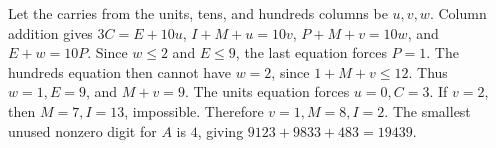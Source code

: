 Let the carries from the units, tens, and hundreds columns be $u,v,w$. Column addition gives $3C=E+10u$, $I+M+u=10v$, $P+M+v=10w$, and $E+w=10P$. Since $w\le2$ and $E\le9$, the last equation forces $P=1$. The hundreds equation then cannot have $w=2$, since $1+M+v\le12$. Thus $w=1,E=9$, and $M+v=9$. The units equation forces $u=0,C=3$. If $v=2$, then $M=7,I=13$, impossible. Therefore $v=1,M=8,I=2$. The smallest unused nonzero digit for $A$ is $4$, giving $9123+9833+483=\boxed{19439}$.
